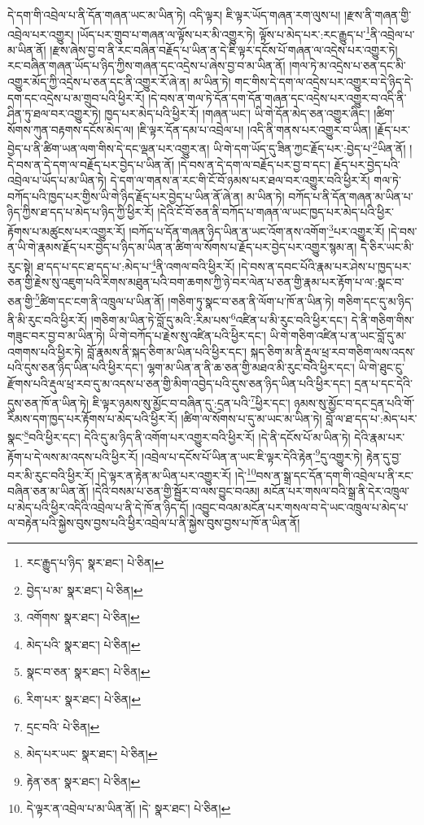 དེ་དག་གི་འབྲེལ་པ་ནི་དོན་གཞན་ཡང་མ་ཡིན་ཏེ། འདི་ལྟར། ཇི་ལྟར་ཡོད་གཞན་རག་ལུས་པ། །རྫས་ནི་གཞན་གྱི་འབྲེལ་པར་འགྱུར། །ཡོད་པར་གྲུབ་པ་གཞན་ལ་ལྟོས་པར་མི་འགྱུར་ཏེ། ལྟོས་པ་མེད་པར་:རང་རྒྱུད་པ་\footnote{རང་རྒྱུད་པ་ཉིད་  སྣར་ཐང་།  པེ་ཅིན། }ནི་འབྲེལ་པ་མ་ཡིན་ནོ། །རྫས་ཞེས་བྱ་བ་ནི་རང་བཞིན་བརྗོད་པ་ཡིན་ན་དེ་ཇི་ལྟར་དངོས་པོ་གཞན་ལ་འདྲེས་པར་འགྱུར་ཏེ། རང་བཞིན་གཞན་ཡོད་པ་ཉིད་ཀྱིས་གཞན་དང་འདྲེས་པ་ཞེས་བྱ་བ་མ་ཡིན་ནོ། །གལ་ཏེ་མ་འདྲེས་པ་ཅན་དང་མི་འགྱུར་མོད་ཀྱི་འདྲེས་པ་ཅན་དང་ནི་འགྱུར་རོ་ཞེ་ན། མ་ཡིན་ཏེ། གང་གིས་དེ་དག་ལ་འདྲེས་པར་འགྱུར་བ་དེ་ཉིད་དེ་དག་དང་འདྲེས་པ་མ་གྲུབ་པའི་ཕྱིར་རོ། །དེ་བས་ན་གལ་ཏེ་དོན་དག་དོན་གཞན་དང་འདྲེས་པར་འགྱུར་བ་འདི་ནི་ཤིན་ཏུ་ཐལ་བར་འགྱུར་ཏེ། ཁྱད་པར་མེད་པའི་ཕྱིར་རོ། །གཞན་ཡང་། ཡི་གེ་དོན་མེད་ཅན་འགྱུར་ཞིང་། །ཚིག་སོགས་ཀུན་བརྟགས་དངོས་མེད་ལ། །ཇི་ལྟར་དོན་དམ་པ་འབྲེལ་པ། །འདི་ནི་གནས་པར་འགྱུར་བ་ཡིན། །རྗོད་པར་བྱེད་པ་ནི་ཚིག་ཡན་ལག་གིས་དེ་དང་ལྡན་པར་འགྱུར་ན། ཡི་གེ་དག་ཡོད་དུ་ཟིན་ཀྱང་རྗོད་པར་:བྱེད་པ་\footnote{བྱེད་པ་མ་  སྣར་ཐང་།  པེ་ཅིན། }ཡིན་ནོ། །དེ་བས་ན་དེ་དག་ལ་བརྗོད་པར་བྱེད་པ་ཡིན་ནོ། །དེ་བས་ན་དེ་དག་ལ་བརྗོད་པར་བྱ་བ་དང་། རྗོད་པར་བྱེད་པའི་འབྲེལ་པ་ཡོད་པ་མ་ཡིན་ཏེ། དེ་དག་ལ་གནས་ན་རང་གི་ངོ་བོ་ཉམས་པར་ཐལ་བར་འགྱུར་བའི་ཕྱིར་རོ། གལ་ཏེ་བཀོད་པའི་ཁྱད་པར་གྱིས་ཡི་གེ་ཉིད་རྗོད་པར་བྱེད་པ་ཡིན་ནོ་ཞེ་ན། མ་ཡིན་ཏེ། བཀོད་པ་ནི་དོན་གཞན་མ་ཡིན་པ་ཉིད་ཀྱིས་ཐ་དད་པ་མེད་པ་ཉིད་ཀྱི་ཕྱིར་རོ། །དེའི་ངོ་བོ་ཅན་ནི་བཀོད་པ་གཞན་ལ་ཡང་ཁྱད་པར་མེད་པའི་ཕྱིར་རྟོགས་པ་མཚུངས་པར་འགྱུར་རོ། །བཀོད་པ་དོན་གཞན་ཉིད་ཡིན་ན་ཡང་འོག་ནས་འགོག་\footnote{འགོགས་  སྣར་ཐང་།  པེ་ཅིན། }པར་འགྱུར་རོ། །དེ་བས་ན་ཡི་གེ་རྣམས་རྗོད་པར་བྱེད་པ་ཉིད་མ་ཡིན་ན་ཚིག་ལ་སོགས་པ་རྗོད་པར་བྱེད་པར་འགྱུར་སྙམ་ན། དེ་ཅིར་ཡང་མི་རུང་སྟེ། ཐ་དད་པ་དང་ཐ་དད་པ་:མེད་པ་\footnote{མེད་པའི་  སྣར་ཐང་།  པེ་ཅིན། }ནི་འགལ་བའི་ཕྱིར་རོ། །དེ་བས་ན་དབང་པོའི་རྣམ་པར་ཤེས་པ་ཁྱད་པར་ཅན་གྱི་རྗེས་སུ་འཇུག་པའི་རིགས་མཐུན་པའི་བག་ཆགས་ཀྱི་ཉེ་བར་ལེན་པ་ཅན་གྱི་རྣམ་པར་རྟོག་པ་ལ་:སྣང་བ་ཅན་གྱི་\footnote{སྣང་བ་ཅན་  སྣར་ཐང་།  པེ་ཅིན། }ཚིག་དང་ངག་ནི་འཁྲུལ་པ་ཡིན་ནོ། །གཅིག་ཏུ་སྣང་བ་ཅན་ནི་ལོག་པ་ཁོ་ན་ཡིན་ཏེ། གཅིག་དང་དུ་མ་ཉིད་ནི་མི་རུང་བའི་ཕྱིར་རོ། །གཅིག་མ་ཡིན་ཏེ་བློ་དུ་མའི་:རིམ་པས་\footnote{རིག་པར་  སྣར་ཐང་།  པེ་ཅིན། }འཛིན་པ་མི་རུང་བའི་ཕྱིར་དང་། དེ་ནི་གཅིག་གིས་གཟུང་བར་བྱ་བ་མ་ཡིན་ཏེ། ཡི་གེ་བཀོད་པ་རྗེས་སུ་འཛིན་པའི་ཕྱིར་དང་། ཡི་གེ་གཅིག་འཛིན་པ་ན་ཡང་བློ་དུ་མ་འགགས་པའི་ཕྱིར་ཏེ། བློ་རྣམས་ནི་སྐད་ཅིག་མ་ཡིན་པའི་ཕྱིར་དང་། སྐད་ཅིག་མ་ནི་རྡུལ་ཕྲ་རབ་གཅིག་ལས་འདས་པའི་དུས་ཅན་ཉིད་ཡིན་པའི་ཕྱིར་དང་། ལྷག་མ་ཡིན་ན་ནི་ཆ་ཅན་གྱི་མཐའ་མི་རུང་བའི་ཕྱིར་དང་། ཡི་གེ་ཐུང་ངུ་རྫོགས་པའི་རྡུལ་ཕྲ་རབ་དུ་མ་འདས་པ་ཅན་གྱི་མིག་འབྱེད་པའི་དུས་ཅན་ཉིད་ཡིན་པའི་ཕྱིར་དང་། དྲན་པ་དང་དེའི་དུས་ཅན་ཁོ་ན་ཡིན་ཏེ། ཇི་ལྟར་ཉམས་སུ་མྱོང་བ་བཞིན་དུ་:དྲན་པའི་\footnote{དྲང་བའི་  པེ་ཅིན། }ཕྱིར་དང་། ཉམས་སུ་མྱོང་བ་དང་དྲན་པའི་གོ་རིམས་དག་ཁྱད་པར་རྟོགས་པ་མེད་པའི་ཕྱིར་རོ། །ཚིག་ལ་སོགས་པ་དུ་མ་ཡང་མ་ཡིན་ཏེ། བློ་ལ་ཐ་དད་པ་:མེད་པར་སྣང་\footnote{མེད་པར་ཡང་  སྣར་ཐང་།  པེ་ཅིན། }བའི་ཕྱིར་དང་། དེའི་དུ་མ་ཉིད་ནི་འགོག་པར་འགྱུར་བའི་ཕྱིར་རོ། །དེ་ནི་དངོས་པོ་མ་ཡིན་ཏེ། དེའི་རྣམ་པར་རྟོག་པ་དེ་ལས་མ་འདས་པའི་ཕྱིར་རོ། །འབྲེལ་པ་དངོས་པོ་ཡིན་ན་ཡང་ཇི་ལྟར་དེའི་རྟེན་\footnote{རྟེན་ཅན་  སྣར་ཐང་།  པེ་ཅིན། }དུ་འགྱུར་ཏེ། རྟེན་དུ་བྱ་བར་མི་རུང་བའི་ཕྱིར་རོ། །དེ་ལྟར་ན་རྟེན་མ་ཡིན་པར་འགྱུར་རོ། །དེ་\footnote{དེ་ལྟར་ན་འབྲེལ་པ་མ་ཡིན་ནོ། །དེ་  སྣར་ཐང་།  པེ་ཅིན། }བས་ན་སྒྲ་དང་དོན་དག་གི་འབྲེལ་པ་ནི་རང་བཞིན་ཅན་མ་ཡིན་ནོ། །དེའི་བསམ་པ་ཅན་གྱི་སྦྱོར་བ་ལས་བྱུང་བའམ། མངོན་པར་གསལ་བའི་སྒྲ་ནི་དེར་འཁྲུལ་པ་མེད་པའི་ཕྱིར་འདིའི་འབྲེལ་པ་ནི་དེ་ཁོ་ན་ཉིད་དོ། །འབྱུང་བའམ་མངོན་པར་གསལ་བ་དེ་ཡང་འཁྲུལ་པ་མེད་པ་ལ་བརྟེན་པའི་སྐྱེས་བུས་བྱས་པའི་ཕྱིར་འབྲེལ་པ་ནི་སྐྱེས་བུས་བྱས་པ་ཁོ་ན་ཡིན་ནོ། 